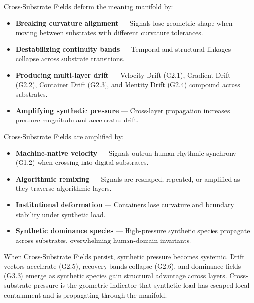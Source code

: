 \medskip

\noindent Cross-Substrate Fields deform the meaning manifold by:

\begin{itemize}[leftmargin=1.2cm]
    \item \textbf{Breaking curvature alignment} — Signals lose geometric shape
    when moving between substrates with different curvature tolerances.

    \item \textbf{Destabilizing continuity bands} — Temporal and structural
    linkages collapse across substrate transitions.

    \item \textbf{Producing multi-layer drift} — Velocity Drift (G2.1),
    Gradient Drift (G2.2), Container Drift (G2.3), and Identity Drift (G2.4)
    compound across substrates.

    \item \textbf{Amplifying synthetic pressure} — Cross-layer propagation
    increases pressure magnitude and accelerates drift.
\end{itemize}

\medskip

\noindent Cross-Substrate Fields are amplified by:

\begin{itemize}[leftmargin=1.2cm]
    \item \textbf{Machine-native velocity} — Signals outrun human rhythmic
    synchrony (G1.2) when crossing into digital substrates.

    \item \textbf{Algorithmic remixing} — Signals are reshaped, repeated, or
    amplified as they traverse algorithmic layers.

    \item \textbf{Institutional deformation} — Containers lose curvature and
    boundary stability under synthetic load.

    \item \textbf{Synthetic dominance species} — High-pressure synthetic species
    propagate across substrates, overwhelming human-domain invariants.
\end{itemize}

\medskip

\noindent When Cross-Substrate Fields persist, synthetic pressure becomes
systemic. Drift vectors accelerate (G2.5), recovery bands collapse (G2.6), and
dominance fields (G3.3) emerge as synthetic species gain structural advantage
across layers. Cross-substrate pressure is the geometric indicator that synthetic
load has escaped local containment and is propagating through the manifold.

